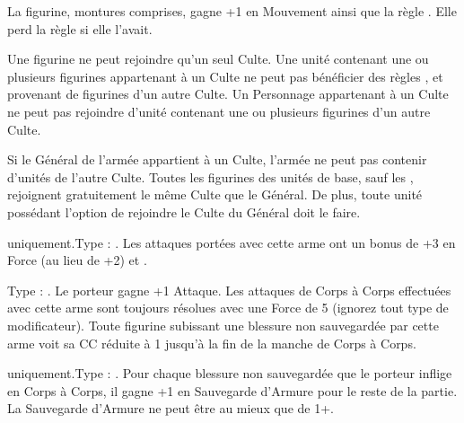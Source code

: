 \begin{multicols}{2}
\begin{center}
La figurine, montures comprises, gagne +1 en Mouvement ainsi que la règle \strider{}. Elle perd la règle \killerinstinct{} si elle l'avait.
\end{center}
\end{multicols}

\armyspecialruleentry{\cultrivalry}

Une figurine ne peut rejoindre qu'un seul Culte. Une unité contenant une ou plusieurs figurines appartenant à un Culte ne peut pas bénéficier des règles \holdyourground{}, \inspiringpresence{} et \divineblessings{} provenant de figurines d'un autre Culte. Un Personnage appartenant à un Culte ne peut pas rejoindre d'unité contenant une ou plusieurs figurines d'un autre Culte.

\armyspecialruleentry{\cultistgeneral}

Si le Général de l'armée appartient à un Culte, l'armée ne peut pas contenir d'unités de l'autre Culte. Toutes les figurines des unités de base, sauf les \bladesofnabh{}, rejoignent gratuitement le même Culte que le Général. De plus, toute unité possédant l'option de rejoindre le Culte du Général doit le faire.

\closearmynewsection

\startarmymagicalitems

\armymagicalweapons

\startpricelist

\infantry{} uniquement.\newline Type : \gw{}. Les attaques portées avec cette arme ont un bonus de +3 en Force (au lieu de +2) et .

Type : \hw{}. Le porteur gagne +1 Attaque. Les attaques de Corps à Corps effectuées avec cette arme sont toujours résolues avec une Force de 5 (ignorez tout type de modificateur). Toute figurine subissant une blessure non sauvegardée par cette arme voit sa CC réduite à 1 jusqu'à la fin de la manche de Corps à Corps.

\endpricelist

\armymagicalarmour

\startpricelist

\infantry{} uniquement.\newline Type : \ha{}. Pour chaque blessure non sauvegardée que le porteur inflige en Corps à Corps, il gagne +1 en Sauvegarde d'Armure pour le reste de la partie. La Sauvegarde d'Armure ne peut être au mieux que de 1+.

